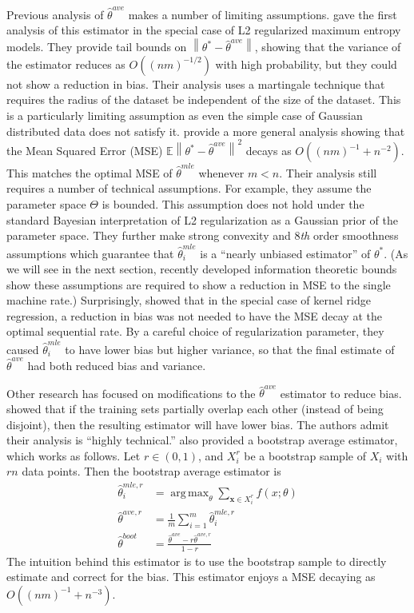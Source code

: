 \documentclass[twoside]{article}
\DeclareMathOperator*{\argmax}{arg\,max}
\newcommand{\E}{\mathbb{E}}
\newcommand{\x}{\mathbf{x}}
\newcommand{\w}{\theta}
\newcommand{\wave}{\hat\w^{ave}}
\newcommand{\waver}{\hat\w^{ave,r}}
\newcommand{\wboot}{\hat\w^{boot}}
\newcommand{\wmle}{\hat\w^{mle}}
\newcommand{\wmler}{\hat\w^{mle,r}}
\newcommand{\wstar}{{\w^{*}}}
\newcommand{\ltwo}[1]{{\left\lVert {#1} \right\rVert}}
\begin{document}
Previous analysis of $\wave$ makes a number of limiting assumptions.
\cite{mcdonald2009efficient} gave the first analysis of this estimator in the special case of L2 regularized maximum entropy models.
They provide tail bounds on $\ltwo{\wstar-\wave}$, showing that the variance of the estimator reduces as $O((nm)^{-1/2})$ with high probability,
but they could not show a reduction in bias.
Their analysis uses a martingale technique that requires the radius of the dataset be independent of the size of the dataset.
This is a particularly limiting assumption as even the simple case of Gaussian distributed data does not satisfy it.
\cite{zhang2012communication} provide a more general analysis showing that the Mean Squared Error (MSE) $\E\ltwo{\wstar-\wave}^2$ decays as $O((nm)^{-1} + n^{-2})$.
This matches the optimal MSE of $\wmle$ whenever $m<n$.
Their analysis still requires a number of technical assumptions.
For example, they assume the parameter space $\Theta$ is bounded.
This assumption does not hold under the standard Bayesian interpretation of L2 regularization as a Gaussian prior of the parameter space.
They further make strong convexity and 8\emph{th} order smoothness assumptions which guarantee that $\wmle_i$ is a ``nearly unbiased estimator'' of $\wstar$.
(As we will see in the next section,
recently developed information theoretic bounds show these assumptions are required to show a reduction in MSE to the single machine rate.)
Surprisingly, \cite{zhang2013divide} showed that in the special case of kernel ridge regression, a reduction in bias was not needed to have the MSE decay at the optimal sequential rate.
By a careful choice of regularization parameter, they caused $\wmle_i$ to have lower bias but higher variance, so that the final estimate of $\wave$ had both reduced bias and variance.

Other research has focused on modifications to the $\wave$ estimator to reduce bias.
\cite{zinkevich2010parallelized} showed that if the training sets partially overlap each other (instead of being disjoint), then the resulting estimator will have lower bias.
The authors admit their analysis is ``highly technical.''
\cite{zhang2012communication} also provided a bootstrap average estimator,
which works as follows.
Let $r\in(0,1)$, and $X_i^r$ be a bootstrap sample of $X_i$ with $rn$ data points.
Then the bootstrap average estimator is
\begin{equation}
\begin{aligned}
\wmler_i &= \argmax_\w \sum_{\x\in X_i^r} f(x;\w)
\\
\waver &= \frac{1}{m}\sum_{i=1}^m \wmler_i
\\
\wboot & = \frac{\wave-r\waver}{1-r}
\end{aligned}
\end{equation}
The intuition behind this estimator is to use the bootstrap sample to directly estimate and correct for the bias.
This estimator enjoys a MSE decaying as $O((nm)^{-1}+n^{-3})$.
\end{document}
